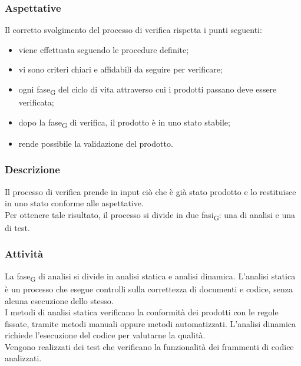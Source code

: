     \subsubsection{Aspettative}
    Il corretto svolgimento del processo di verifica rispetta i punti seguenti:
    \begin{itemize}
    	\item viene effettuata seguendo le procedure definite;
    	\item vi sono criteri chiari e affidabili da seguire per verificare;
    	\item ogni fase\textsubscript{G} del ciclo di vita attraverso cui i prodotti passano deve essere verificata;
    	\item dopo la fase\textsubscript{G} di  verifica, il prodotto è in uno stato stabile;
    	\item rende possibile la validazione del prodotto.
    \end{itemize}
    \subsubsection{Descrizione}
    Il processo di verifica prende in input ciò che è già stato prodotto e lo restituisce in uno stato conforme alle aspettative.\\Per ottenere tale risultato, il processo si divide in due fasi\textsubscript{G}: una di analisi e una di test.
    \subsubsection{Attività}
    La fase\textsubscript{G} di analisi si divide in analisi statica e analisi dinamica.
    L'analisi statica è un processo che esegue controlli sulla correttezza di documenti e codice, senza alcuna esecuzione dello stesso.\\I metodi di analisi statica verificano la conformità dei prodotti con le regole fissate, tramite metodi manuali oppure metodi automatizzati.
    L'analisi dinamica richiede l'esecuzione del codice per valutarne la qualità.\\Vengono realizzati dei test  che verificano la funzionalità dei frammenti di codice analizzati.

